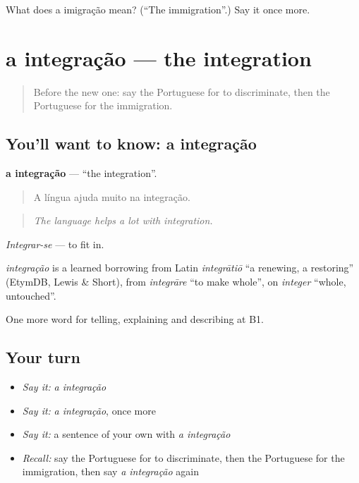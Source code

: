 \begin{tcolorbox}[breakable,colback=teal!4,colframe=teal!35!black,title={Before you move on}]
What does a imigração mean? (\textquotedblleft{}The immigration\textquotedblright{}.) Say it once more.
\end{tcolorbox}
\section[a integração]{a integração — the integration}

\label{lesson:PT-C366-integracao}



\begin{quote}
Before the new one: say the Portuguese for to discriminate, then the Portuguese for the immigration.
\end{quote}

\subsection*{You'll want to know: a integração}
\textbf{a integração} — \textquotedblleft{}the integration\textquotedblright{}.

\begin{quote}
A língua ajuda muito na integração.
\end{quote}

\begin{quote}
\emph{The language helps a lot with integration.}
\end{quote}

\emph{Integrar-se} — to fit in.

\begin{cousinweb}
\emph{integração} is a learned borrowing from Latin \emph{integrātiō} \textquotedblleft{}a renewing, a restoring\textquotedblright{} (EtymDB, Lewis \& Short), from \emph{integrāre} \textquotedblleft{}to make whole\textquotedblright{}, on \emph{integer} \textquotedblleft{}whole, untouched\textquotedblright{}.
\end{cousinweb}

\begin{grammarlens}[title={What you've built}]
One more word for telling, explaining and describing at B1.
\end{grammarlens}

\subsection*{Your turn}
\begin{itemize}
\raggedright
  \item \emph{Say it:} \emph{a integração}
  \item \emph{Say it:} \emph{a integração}, once more
  \item \emph{Say it:} a sentence of your own with \emph{a integração}
  \item \emph{Recall:} say the Portuguese for to discriminate, then the Portuguese for the immigration, then say \emph{a integração} again
\end{itemize}

